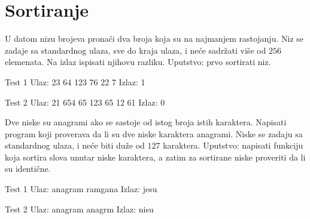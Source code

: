 \section{Sortiranje}


\begin{Exercise}[label=501]
  U datom nizu brojeva pronaći dva broja koja su na najmanjem
  rastojanju. Niz se zadaje sa standardnog ulaza, sve do kraja ulaza,
  i neće sadržati više od $256$ elemenata. Na izlaz ispisati njihovu
  razliku.  Uputstvo: prvo sortirati niz.
  
\begin{miditest}
\begin{test}{Test 1}
Ulaz:   23 64 123 76 22 7
Izlaz:  1
\end{test}
\end{miditest}

\begin{miditest}
\begin{test}{Test 2}
Ulaz:   21 654 65 123 65 12 61
Izlaz:  0
\end{test}
\end{miditest}
  
\end{Exercise}

\begin{Answer}[ref=501]
\end{Answer}
\begin{Exercise}[label=502]
  Dve niske su anagrami ako se sastoje od istog broja istih
  karaktera. Napisati program koji proverava da li su dve niske
  karaktera anagrami.  Niske se zadaju sa standardnog ulaza, i neće
  biti duže od $127$ karaktera.  Uputstvo: napisati funkciju koja
  sortira slova unutar niske karaktera, a zatim za sortirane niske
  proveriti da li su identične.
  
\begin{miditest}
\begin{test}{Test 1}
Ulaz:   anagram ramgana
Izlaz:  jesu
\end{test}
\end{miditest}
\begin{miditest}
\begin{test}{Test 2}
Ulaz:   anagram anagrm
Izlaz:  nisu
\end{test}
\end{miditest}
  
\end{Exercise}

